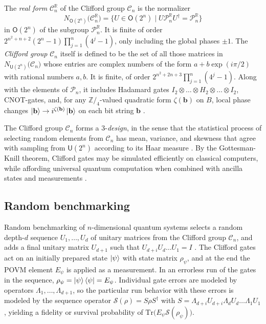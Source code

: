 \documentclass[12pt,a4paper]{amsart}
\numberwithin{equation}{section}
\theoremstyle{plain}
\theoremstyle{definition}
\begin{document}
The \emph{real form} ${\mathcal C}_n^\mathbb R$ of the Clifford group $\mathcal C_n$ is the normalizer
$$
N_{\mathsf O(2^n)}\big({\mathcal C}_n^\mathbb R\big)=
\{U\in \mathsf O(2^n)\mid U{\mathcal P}_n^\mathbb RU^\dag={\mathcal P}_n^\mathbb R\}
$$
in $\mathsf O(2^n)$ of the subgroup ${\mathcal P}_n^\mathbb R$. It is finite  of order $2^{n^2+n+2}(2^n-1)\prod_{j=1}^n(4^j-1)$, only including the global phases $\pm1$. 
The \emph{Clifford group} $\mathcal C_n$ itself is defined to be the set of all those matrices in $N_{\mathsf U(2^n)}\big({\mathcal C}_n\big)$ whose entries are complex numbers of the form $a+b\exp(i\pi/2)$ with rational numbers $a,b$. It is finite, of order $2^{n^2+2n+3}\prod_{j=1}^n(4^j-1)$. Along with the elements of $\mathcal P_n$, it includes Hadamard gates $I_2\otimes\ldots\otimes H_2\otimes\ldots\otimes I_2$, CNOT-gates, and, for any $\mathbb Z/_4$-valued quadratic form $\zeta(\mathbf b)$ on $B$, local phase changes $\ket{\mathbf b}\to i^{\zeta(\mathbf b)}\ket{\mathbf b}$ on each bit string $\mathbf b$ \cite{CalRainsShorSloane}.


The {Clifford group} $\mathcal C_n$ forms a $3$-\emph{design}, in the sense that the statistical process of selecting random elements from $\mathcal C_n$ has mean, variance, and skewness that agree with sampling from $\mathsf U(2^n)$ according to its Haar measure \cite{Webb}. By the Gottesman-Knill theorem, Clifford gates may be simulated efficiently on classical computers, while affording universal quantum computation when combined with ancilla states and measurements \cite{randClifGrou}.


\subsection{Random benchmarking}\label{SS:RB}


Random benchmarking of $n$-dimensional quantum systems selects a random depth-$d$ sequence $U_1,\ldots, U_d$ of unitary matrices from the Clifford group $\mathcal C_n$, and adds a final unitary matrix $U_{d+1}$ such that $U_{d+i}U_d\ldots U_1=I$ \cite{randBencSimu,randBencSubs}. The Clifford gates act on an initially prepared state $\ket\psi$ with state matrix $\rho_\psi$, and at the end the POVM element $E_\psi$ is applied as a measurement. In an errorless run of the gates in the sequence, $\rho_\psi=\ket\psi\bra\psi=E_\psi$. Individual gate errors are modeled by operators $\Lambda_1,\ldots,\Lambda_{d+1}$, so the particular run behavior with these errors is modeled by the sequence operator
$\mathcal S(\rho)=S\rho S^\dag$ with
$
S=\Lambda_{d+i}U_{d+i}\Lambda_dU_d\ldots\Lambda_1U_1
$, 
yielding a fidelity or survival probability of $\mathrm{Tr}\big(E_\psi\mathcal S(\rho_\psi)\big)$. \cite{randBencRobu}
\end{document}
